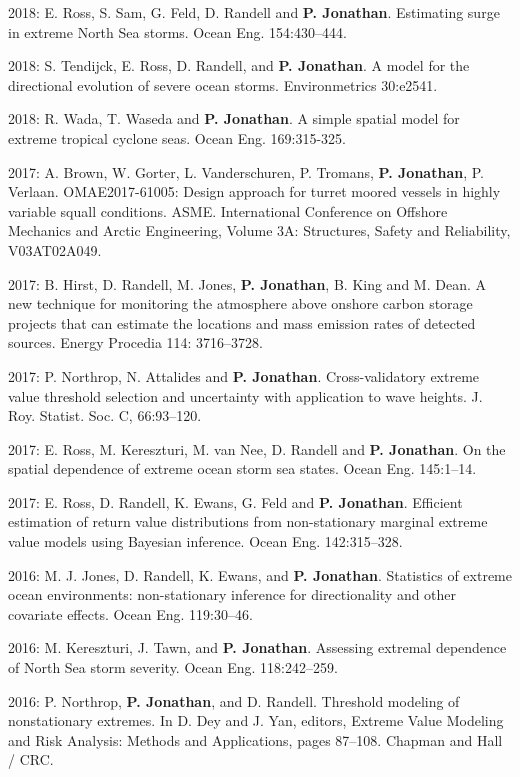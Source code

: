 \documentclass[11pt,a4paper]{moderncv}
\begin{document}
2018: E. Ross, S. Sam, G. Feld, D. Randell and \textbf{P. Jonathan}. Estimating surge in extreme North Sea storms. Ocean Eng. 154:430--444.

2018: S. Tendijck, E. Ross, D. Randell, and \textbf{P. Jonathan}. A model for the directional evolution of severe ocean storms. Environmetrics 30:e2541.

2018: R. Wada, T. Waseda and \textbf{P. Jonathan}. A simple spatial model for extreme tropical cyclone seas.  Ocean Eng. 169:315-325.

2017: A. Brown, W. Gorter, L. Vanderschuren, P. Tromans, \textbf{P. Jonathan}, P. Verlaan. OMAE2017-61005: Design approach for turret moored vessels in highly variable squall conditions. ASME. International Conference on Offshore Mechanics and Arctic Engineering, Volume 3A: Structures, Safety and Reliability, V03AT02A049.

2017: B. Hirst, D. Randell, M. Jones, \textbf{P. Jonathan}, B. King and M. Dean. A new technique for monitoring the atmosphere above onshore carbon storage projects that can estimate the locations and mass emission rates of detected sources.  Energy Procedia 114: 3716--3728.

2017: P. Northrop, N. Attalides and \textbf{P. Jonathan}. Cross-validatory extreme value threshold selection and uncertainty with application to wave heights. J. Roy. Statist. Soc. C, 66:93--120.

2017: E. Ross, M. Kereszturi, M. van Nee, D. Randell and \textbf{P. Jonathan}. On the spatial dependence of extreme ocean storm sea states. Ocean Eng. 145:1--14.

2017: E. Ross, D. Randell, K. Ewans, G. Feld and \textbf{P. Jonathan}. Efficient estimation of return value distributions from non-stationary marginal extreme value models using Bayesian inference. Ocean Eng. 142:315--328.

2016: M. J. Jones, D. Randell, K. Ewans, and \textbf{P. Jonathan}. Statistics of extreme ocean environments: non-stationary inference for directionality and other covariate effects. Ocean Eng. 119:30--46.

2016: M. Kereszturi, J. Tawn, and \textbf{P. Jonathan}. Assessing extremal dependence of North Sea storm severity. Ocean Eng. 118:242--259.

2016: P. Northrop, \textbf{P. Jonathan}, and D. Randell. Threshold modeling of nonstationary extremes. In D. Dey and J. Yan, editors, Extreme Value Modeling and Risk Analysis: Methods and Applications, pages 87--108. Chapman and Hall / CRC.
\end{document}
